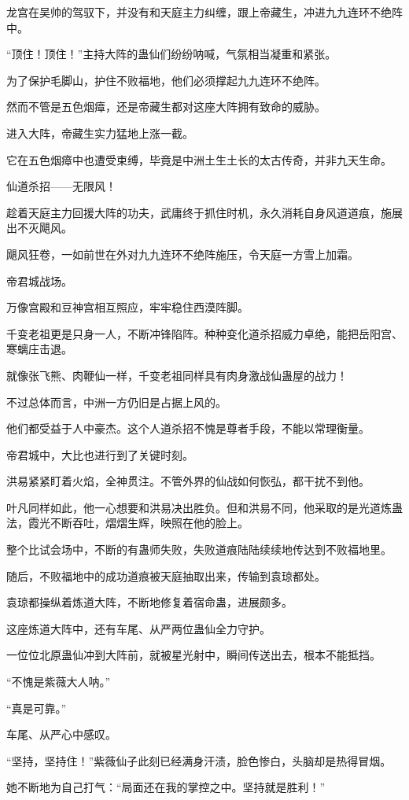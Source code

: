 \begin{this_body}
龙宫在吴帅的驾驭下，并没有和天庭主力纠缠，跟上帝藏生，冲进九九连环不绝阵中。

“顶住！顶住！”主持大阵的蛊仙们纷纷呐喊，气氛相当凝重和紧张。

为了保护毛脚山，护住不败福地，他们必须撑起九九连环不绝阵。

然而不管是五色烟瘴，还是帝藏生都对这座大阵拥有致命的威胁。

进入大阵，帝藏生实力猛地上涨一截。

它在五色烟瘴中也遭受束缚，毕竟是中洲土生土长的太古传奇，并非九天生命。

仙道杀招——无限风！

趁着天庭主力回援大阵的功夫，武庸终于抓住时机，永久消耗自身风道道痕，施展出不灭飓风。

飓风狂卷，一如前世在外对九九连环不绝阵施压，令天庭一方雪上加霜。

帝君城战场。

万像宫殿和豆神宫相互照应，牢牢稳住西漠阵脚。

千变老祖更是只身一人，不断冲锋陷阵。种种变化道杀招威力卓绝，能把岳阳宫、寒螭庄击退。

就像张飞熊、肉鞭仙一样，千变老祖同样具有肉身激战仙蛊屋的战力！

不过总体而言，中洲一方仍旧是占据上风的。

他们都受益于人中豪杰。这个人道杀招不愧是尊者手段，不能以常理衡量。

帝君城中，大比也进行到了关键时刻。

洪易紧紧盯着火焰，全神贯注。不管外界的仙战如何恢弘，都干扰不到他。

叶凡同样如此，他一心想要和洪易决出胜负。但和洪易不同，他采取的是光道炼蛊法，霞光不断吞吐，熠熠生辉，映照在他的脸上。

整个比试会场中，不断的有蛊师失败，失败道痕陆陆续续地传达到不败福地里。

随后，不败福地中的成功道痕被天庭抽取出来，传输到袁琼都处。

袁琼都操纵着炼道大阵，不断地修复着宿命蛊，进展颇多。

这座炼道大阵中，还有车尾、从严两位蛊仙全力守护。

一位位北原蛊仙冲到大阵前，就被星光射中，瞬间传送出去，根本不能抵挡。

“不愧是紫薇大人呐。”

“真是可靠。”

车尾、从严心中感叹。

“坚持，坚持住！”紫薇仙子此刻已经满身汗渍，脸色惨白，头脑却是热得冒烟。

她不断地为自己打气：“局面还在我的掌控之中。坚持就是胜利！”


\end{this_body}
